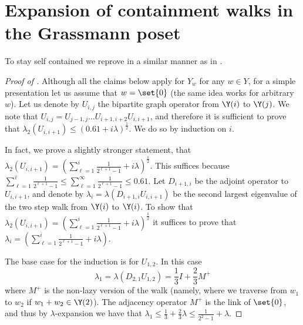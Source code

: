 \section{Expansion of containment walks in the Grassmann poset} \label{app:grassmann-containment}
To stay self contained we reprove  in a similar manner as in \cite{DiksteinDFH2018}.
\begin{proof}[Proof of ]
    Although all the claims below apply for \(Y_w\) for any \(w \in Y\), for a simple presentation let us assume that \(w = \set{0}\) (the same idea works for arbitrary \(w\)). Let us denote by \(U_{i,j}\) the bipartite graph operator from \(\Y(i)\) to \(\Y(j)\). We note that \(U_{i,j} = U_{j-1,j} \dots U_{i+1,i+2} U_{i,i+1}\), and therefore it is sufficient to prove that \(\lambda_2(U_{i,i+1}) \leq \left (0.61 + i \lambda \right )^{\frac{1}{2}}\). We do so by induction on \(i\).

    In fact, we prove a slightly stronger statement, that \(\lambda_2(U_{i,i+1}) = \left (\sum_{\ell=1}^i \frac{1}{2^{\ell+1}-1} + i \lambda \right )^{\frac{1}{2}}\). This suffices because \(\sum_{\ell=1}^i \frac{1}{2^{\ell+1}-1} \leq \sum_{\ell=1}^\infty \frac{1}{2^{\ell+1}-1} \leq 0.61\). %
    Let \(D_{i+1,i}\) be the adjoint operator to \(U_{i,i+1}\), and denote by \(\lambda_i = \lambda(D_{i+1,i}U_{i,i+1})\) be the second largest eigenvalue of the two step walk from \(\Y(i)\) to \(\Y(i)\). To show that \(\lambda_2(U_{i,i+1}) = \left (\sum_{\ell=1}^i \frac{1}{2^{\ell+1}-1} + i \lambda \right )^{\frac{1}{2}}\) it suffices to prove that \(\lambda_i = \left (\sum_{\ell=1}^i \frac{1}{2^{\ell+1}-1} + i \lambda \right )\).

    The base case for the induction is for \(U_{1,2}\). In this case
    \[\lambda_1 = \lambda(D_{2,1} U_{1,2}) = \frac{1}{3}I + \frac{2}{3}M^+\]
    where \(M^+\) is the non-lazy version of the walk (namely, where we traverse from \(w_1\) to \(w_2\) if \(w_1 +w_2 \in \Y(2)\)). The adjacency operator \(M^+\) is the link of \(\set{0}\), and thus by \(\lambda\)-expansion we have that \(\lambda_1 \leq \frac{1}{3} + \frac{2}{3} \lambda \leq \frac{1}{2^2-1} + \lambda\).


\end{proof}
